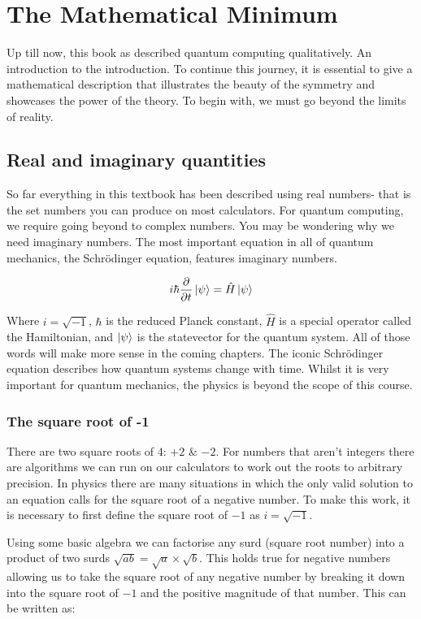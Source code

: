 \documentclass{book}
\begin{document}
\chapter{The Mathematical Minimum}

Up till now, this book as described quantum computing qualitatively. An introduction to the introduction. To continue this journey, it is essential to give a mathematical description that illustrates the beauty of the symmetry and showcases the power of the theory. To begin with, we must go beyond the limits of reality. 

\section{Real and imaginary quantities}

So far everything in this textbook has been described using real numbers- that is the set numbers you can produce on most calculators. For quantum computing, we require going beyond to complex numbers. You may be wondering why we need imaginary numbers. The most important equation in all of quantum mechanics, the Schrödinger equation, features imaginary numbers. 

$$ i\hbar \frac{\partial{}}{\partial{t}}\ket{\psi} = \hat{H}\ket{\psi} $$

Where $i = \sqrt{-1}$, $\hbar$ is the reduced Planck constant, $\hat{H}$ is a special operator called the Hamiltonian, and $\ket{\psi}$ is the statevector for the quantum system. All of those words will make more sense in the coming chapters. The iconic Schrödinger equation describes how quantum systems change with time. Whilst it is very important for quantum mechanics, the physics is beyond the scope of this course. 

\subsection{ The square root of -1}

There are two square roots of $4$: $+2$ \& $-2$. For numbers that aren't integers there are algorithms we can run on our calculators to work out the roots to arbitrary precision. In physics there are many situations in which the only valid solution to an equation calls for the square root of a negative number. To make this work, it is necessary to first define the square root of $-1$ as $i = \sqrt{-1}$. 

Using some basic algebra we can factorise any surd (square root number) into a product of two surds $ \sqrt{ab} = \sqrt{a} \times \sqrt{b}$. This holds true for negative numbers allowing us to take the square root of any negative number by breaking it down into the square root of $-1$ and the positive magnitude of that number. This can be written as:
\end{document}
